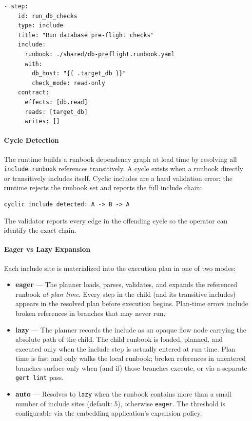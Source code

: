\begin{verbatim}
- step:
    id: run_db_checks
    type: include
    title: "Run database pre-flight checks"
    include:
      runbook: ./shared/db-preflight.runbook.yaml
      with:
        db_host: "{{ .target_db }}"
        check_mode: read-only
    contract:
      effects: [db.read]
      reads: [target_db]
      writes: []
\end{verbatim}

\paragraph{Cycle Detection}
The runtime builds a runbook dependency graph at load time by resolving all
\texttt{include.runbook} references transitively.  A cycle exists when a runbook
directly or transitively includes itself.  Cyclic includes are a hard validation
error; the runtime rejects the runbook set and reports the full include chain:

\begin{verbatim}
cyclic include detected: A -> B -> A
\end{verbatim}

The validator reports every edge in the offending cycle so the operator can
identify the exact chain.

\paragraph{Eager vs Lazy Expansion}
\label{para:include-expand}

Each include site is materialized into the execution plan in one of two modes:

\begin{itemize}
  \item \textbf{eager} — The planner loads, parses, validates, and expands the
        referenced runbook \emph{at plan time}. Every step in the child (and its
        transitive includes) appears in the resolved plan before execution
        begins. Plan-time errors include broken references in branches that may
        never run.
  \item \textbf{lazy} — The planner records the include as an opaque flow node
        carrying the absolute path of the child. The child runbook is loaded,
        planned, and executed only when the include step is actually entered at
        run time. Plan time is fast and only walks the local runbook; broken
        references in unentered branches surface only when (and if) those
        branches execute, or via a separate \texttt{gert lint} pass.
  \item \textbf{auto} — Resolves to \texttt{lazy} when the runbook contains
        more than a small number of include sites (default: 5), otherwise
        \texttt{eager}. The threshold is configurable via the embedding
        application's expansion policy.
\end{itemize}

